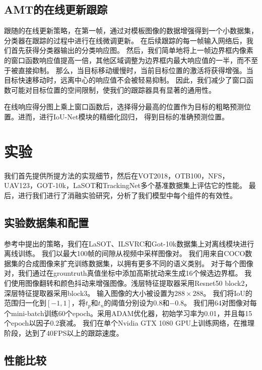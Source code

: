 \documentclass[promaster]{thesis-uestc}
\begin{document}
\subsection{AMT的在线更新跟踪}
跟随\cite{danelljan2019atom}的在线更新策略，在第一帧，通过对模板图像的数据增强得到一个小数据集，
分类器在跟踪的过程中进行在线微调更新。
在后续跟踪的每一帧输入网络后，我们首先获得分类器输出的分类响应图。
然后，我们简单地将上一帧边界框内像素的窗口函数响应值提高一倍，其他区域调整为边界框内最大响应值的一半，而不至于被直接抑制。
那么，当目标移动缓慢时，当前目标位置的激活将获得增强。当目标快速移动时，远离中心的响应值不会被轻易抑制。
因此，我们减少了窗口函数可能对目标位置的空间限制，使我们的跟踪器具有显著的通用性。

在线响应得分图上乘上窗口函数后，选择得分最高的位置作为目标的粗略预测位置。进而，进行IoU-Net模块的精细化回归，
得到目标的准确预测位置。


\section{实验}
我们首先提供所提方法的实现细节，然后在VOT2018\cite{VOT18}，OTB100\cite{OTB15}，NFS\cite{NFS}，
UAV123\cite{UAV}，GOT-10k\cite{GOT10k}，LaSOT\cite{LaSOT}和TrackingNet\cite{TrackingNet}多个基准数据集上评估它的性能。
最后，进行我们进行了消融实验研究，分析了我们模型中每个组件的有效性。

\subsection{实验数据集和配置}
参考\cite{danelljan2019atom}中提出的策略，我们在LaSOT、ILSVRC\cite{imagenet}和Got-10k数据集上对离线模块进行离线训练。
我们以最大100帧的间隙从视频中采样图像对。
我们用来自COCO数据集的合成图像来扩充训练数据集，以拥有更多不同的语义类别。
对于每个图像对，我们通过在grountruth真值坐标中添加高斯扰动来生成16个候选边界框。
我们使用图像翻转和颜色抖动来增强图像。浅层特征提取器采用Resnet50 block2，深层特征提取器采用block3。
输入图像的大小被设置为$288 \times288$。
我们将IoU的范围归一化到$[-1,1]$，将$t_{p}$和$t_{n}$的阈值分别设为$0.8$和$-0.8$。
我们用64对图像对每个mini-batch训练60个epoch。采用ADAM优化器，初始学习率为0.01，并且每15个epoch以因子$0.2$衰减。
我们在单个Nvidia GTX 1080 GPU上训练网络，在推理阶段，达到了40FPS以上的跟踪速度。

\subsection{性能比较}
\end{document}
